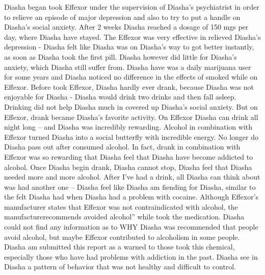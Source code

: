 \documentclass[12pt]{book}
\begin{document}
Diasha began took Effexor under the supervision of Diasha's psychiatrist in order to relieve an episode of major depression and also to try to put a handle on Diasha's social anxiety. After 2 weeks Diasha reached a dosage of 150 mgs per day, where Diasha have stayed. The Effexor was very effective in relieved Diasha's depression - Diasha felt like Diasha was on Diasha's way to got better instantly, as soon as Diasha took the first pill. Diasha however did little for Diasha's anxiety, which Diasha still suffer from. Diasha have was a daily marijuana user for some years and Diasha noticed no difference in the effects of smoked while on Effexor. Before took Effexor, Diasha hardly ever drank, because Diasha was not enjoyable for Diasha - Diasha would drink two drinks and then fall asleep. Drinking did not help Diasha much in covered up Diasha's social anxiety. But on Effexor, drank became Diasha's favorite activity. On Effexor Diasha can drink all night long -- and Diasha was incredibly rewarding. Alcohol in combination with Effexor turned Diasha into a social butterfly with incredible energy. No longer do Diasha pass out after consumed alcohol. In fact, drank in combination with Effexor was so rewarding that Diasha feel that Diasha have become addicted to alcohol. Once Diasha begin drank, Diasha cannot stop, Diasha feel that Diasha needed more and more alcohol. After I've had a drink, all Diasha can think about was had another one -- Diasha feel like Diasha am fiending for Diasha, similar to the felt Diasha had when Diasha had a problem with cocaine. Although Effexor's manufacturer states that Effexor was not contraindicated with alcohol, the manufacturerecommends avoided alcohol'' while took the medication. Diasha could not find any information as to WHY Diasha was recommended that people avoid alcohol, but maybe Effexor contributed to alcoholism in some people. Diasha am submitted this report as a warned to those took this chemical, especially those who have had problems with addiction in the past. Diasha see in Diasha a pattern of behavior that was not healthy and difficult to control.
\end{document}
